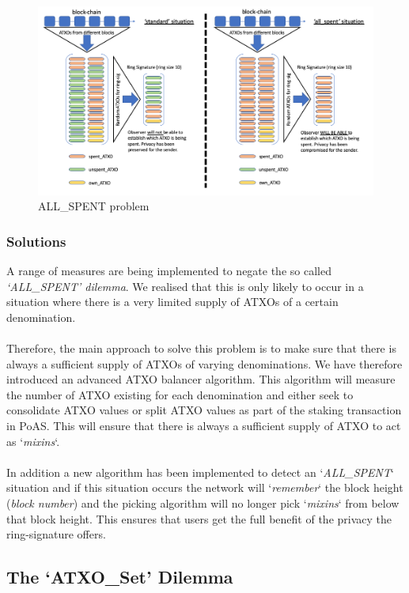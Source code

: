\begin{figure}[ht]
    \centering
    \includegraphics[width=\textwidth]{Images/allspentproblem.png}
    \caption{ALL\_SPENT problem}
    \label{fig:my_label}
\end{figure}

\subsubsection{Solutions}
A range of measures are being implemented to negate the so called
\textit{‘ALL\_SPENT’ dilemma}. We realised that this is only likely
to occur in a situation where there is a very limited supply of
ATXOs of a certain denomination.
\\
\\
\noindent
Therefore, the main approach to solve this problem is to make sure that
there is always a sufficient supply of ATXOs of varying denominations.
We have therefore introduced an advanced ATXO balancer algorithm. This
algorithm will measure the number of ATXO existing for each denomination
and either seek to consolidate ATXO values or split ATXO values as part
of the staking transaction in PoAS. This will ensure that there is
always a sufficient supply of ATXO to act as ‘\textit{mixins}‘.
\\
\\
\noindent
In addition a new algorithm has been implemented to detect an
‘\textit{ALL\_SPENT}‘ situation and if this situation occurs
the network will ‘\textit{remember}‘ the block height (\textit{block number})
and the picking algorithm will no longer pick ‘\textit{mixins}‘
from below that block height. This ensures that users get the full
benefit of the privacy the ring-signature offers.



\subsection{The ‘ATXO\_Set’ Dilemma}

